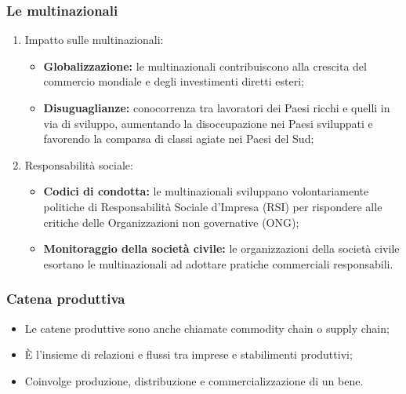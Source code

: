 \documentclass{article}
\begin{document}
\subsubsection{Le multinazionali}
\begin{enumerate}
    \item Impatto sulle multinazionali:
        \begin{itemize}
            \item \textbf{Globalizzazione:} le multinazionali contribuiscono alla crescita
                del commercio mondiale e degli investimenti diretti esteri;
            \item \textbf{Disuguaglianze:} conocorrenza tra lavoratori dei Paesi ricchi e
                quelli in via di sviluppo, aumentando la disoccupazione nei Paesi sviluppati
                e favorendo la comparsa di classi agiate nei Paesi del Sud;
        \end{itemize}
    \item Responsabilità sociale:
        \begin{itemize}
            \item \textbf{Codici di condotta:} le multinazionali sviluppano volontariamente
                politiche di Responsabilità Sociale d'Impresa (RSI) per rispondere alle
                critiche delle Organizzazioni non governative (ONG);
            \item \textbf{Monitoraggio della società civile:} le organizzazioni della società
                civile esortano le multinazionali ad adottare pratiche commerciali responsabili.
        \end{itemize}
\end{enumerate}

\subsubsection{Catena produttiva}
\begin{itemize}
    \item Le catene produttive sono anche chiamate commodity chain o supply chain;
    \item È l'insieme di relazioni e flussi tra imprese e stabilimenti produttivi;
    \item Coinvolge produzione, distribuzione e commercializzazione di un bene.
\end{itemize}
\end{document}
